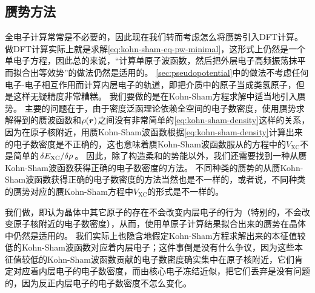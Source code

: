 \subsection{赝势方法}

全电子计算常常是不必要的，因此现在我们转而考虑怎么将赝势引入DFT计算。
做DFT计算实际上就是求解\eqref{eq:kohn-sham-eq-pw-minimal}，这形式上仍然是一个单电子方程，因此总的来说，“计算单原子波函数，然后把外层电子高频振荡抹平而拟合出等效势”的做法仍然是适用的。
\autoref{sec:pseudopotential}中的做法不考虑任何电子-电子相互作用而计算内层电子的轨道，即把介质中的原子当成类氢原子，但是这样无疑精度非常糟糕。
我们要做的是在Kohn-Sham方程求解中适当地引入赝势。
主要的问题在于，由于密度泛函理论依赖全空间的电子数密度，使用赝势求解得到的赝波函数和$\rho(\vb*{r})$之间没有非常简单的\eqref{eq:kohn-sham-density}这样的关系，因为在原子核附近，用赝Kohn-Sham波函数根据\eqref{eq:kohn-sham-density}计算出来的电子数密度是不正确的，这也意味着赝Kohn-Sham波函数服从的方程中的$V_\text{XC}$不是简单的$\fdv*{E_\text{XC}}{\rho}$。
因此，除了构造柔和的势能以外，我们还需要找到一种从赝Kohn-Sham波函数获得正确的电子数密度的方法。
不同种类的赝势的从赝Kohn-Sham波函数获得正确的电子数密度的方法当然也是不一样的，或者说，不同种类的赝势对应的赝Kohn-Sham方程中$V_\text{XC}$的形式是不一样的。

我们做，即认为晶体中其它原子的存在不会改变内层电子的行为（特别的，不会改变原子核附近的电子数密度），从而，使用单原子计算结果拟合出来的赝势在晶体中仍然是适用的。
我们实际上也隐含地假定Kohn-Sham方程求解出来的本征值较低的Kohn-Sham波函数对应着内层电子；这件事倒是没有什么争议，因为这些本征值较低的Kohn-Sham波函数贡献的电子数密度确实集中在原子核附近，它们肯定对应着内层电子的电子数密度，而由核心电子冻结近似，把它们丢弃是没有问题的，因为反正内层电子的电子数密度不怎么变化。

